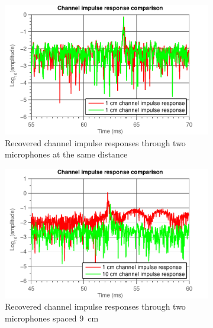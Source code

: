 \documentclass[11pt,titlepage]{report}
\begin{document}
\begin{figure}[H]
	\centering
	\begin{subfigure}{.49\textwidth}
		\includegraphics[width=\linewidth]{../../deliverable-7-resources/figures/ass-2/report-2-3/ass-2-report-2-impulse-responses-1.pdf}
		\caption{\centering Recovered channel impulse responses through two microphones at the same distance}
	\end{subfigure}
	\begin{subfigure}{.49\textwidth}
		\includegraphics[width=\linewidth]{../../deliverable-7-resources/figures/ass-2/report-2-3/ass-2-report-2-impulse-responses-2.pdf}
		\caption{\centering Recovered channel impulse responses through two microphones spaced \SI{9}{cm}}
	\end{subfigure}
	\begin{subfigure}{.49\textwidth}

\end{subfigure}
\end{figure}
\end{document}
